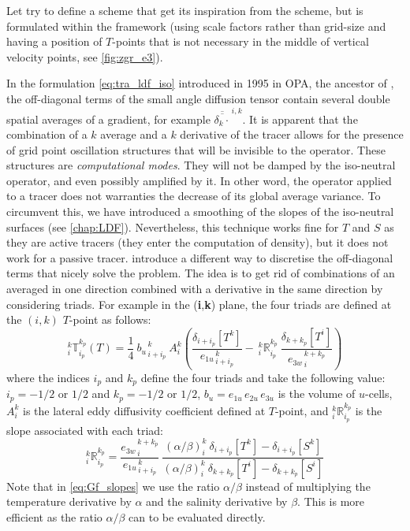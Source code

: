 \documentclass[../main/NEMO_manual]{subfiles}
\begin{document}
Let try to define a scheme that get its inspiration from the \citet{Griffies_al_JPO98} scheme,
but is formulated within the \NEMO framework
(\ie using scale factors rather than grid-size and having a position of $T$-points that
is not necessary in the middle of vertical velocity points, see \autoref{fig:zgr_e3}).

In the formulation \autoref{eq:tra_ldf_iso} introduced in 1995 in OPA, the ancestor of \NEMO,
the off-diagonal terms of the small angle diffusion tensor contain several double spatial averages of a gradient,
for example $\overline{\overline{\delta_k \cdot}}^{\,i,k}$.
It is apparent that the combination of a $k$ average and a $k$ derivative of the tracer allows for
the presence of grid point oscillation structures that will be invisible to the operator.
These structures are \textit{computational modes}.
They will not be damped by the iso-neutral operator, and even possibly amplified by it.
In other word, the operator applied to a tracer does not warranties the decrease of its global average variance.
To circumvent this, we have introduced a smoothing of the slopes of the iso-neutral surfaces
(see \autoref{chap:LDF}).
Nevertheless, this technique works fine for $T$ and $S$ as they are active tracers
(\ie they enter the computation of density), but it does not work for a passive tracer.
\citep{Griffies_al_JPO98} introduce a different way to discretise the off-diagonal terms that
nicely solve the problem.
The idea is to get rid of combinations of an averaged in one direction combined with
a derivative in the same direction by considering triads.
For example in the (\textbf{i},\textbf{k}) plane, the four triads are defined at the $(i,k)$ $T$-point as follows:
\begin{equation}
  \label{eq:Gf_triads}
  _i^k \mathbb{T}_{i_p}^{k_p} (T)
  = \frac{1}{4} \ {b_u}_{\,i+i_p}^{\,k}  \  A_i^k  	\left(
    \frac{ \delta_{i + i_p}[T^k] }{ {e_{1u}}_{\,i + i_p}^{\,k} }
    -\ {_i^k \mathbb{R}_{i_p}^{k_p}} \ \frac{ \delta_{k+k_p} [T^i] }{ {e_{3w}}_{\,i}^{\,k+k_p} }
  \right)
\end{equation}
where the indices $i_p$ and $k_p$ define the four triads and take the following value:
$i_p = -1/2$ or $1/2$ and $k_p = -1/2$ or $1/2$,
$b_u= e_{1u}\,e_{2u}\,e_{3u}$ is the volume of $u$-cells,
$A_i^k$ is the lateral eddy diffusivity coefficient defined at $T$-point,
and $_i^k \mathbb{R}_{i_p}^{k_p}$ is the slope associated with each triad:
\begin{equation}
  \label{eq:Gf_slopes}
  _i^k \mathbb{R}_{i_p}^{k_p}
  =\frac{ {e_{3w}}_{\,i}^{\,k+k_p}} { {e_{1u}}_{\,i+i_p}^{\,k}} \ \frac
  {\left(\alpha / \beta \right)_i^k  \ \delta_{i + i_p}[T^k] - \delta_{i + i_p}[S^k] }
  {\left(\alpha / \beta \right)_i^k  \ \delta_{k+k_p}[T^i ] - \delta_{k+k_p}[S^i ] }
\end{equation}
Note that in \autoref{eq:Gf_slopes} we use the ratio $\alpha / \beta$ instead of
multiplying the temperature derivative by $\alpha$ and the salinity derivative by $\beta$.
This is more efficient as the ratio $\alpha / \beta$ can to be evaluated directly.
\end{document}
